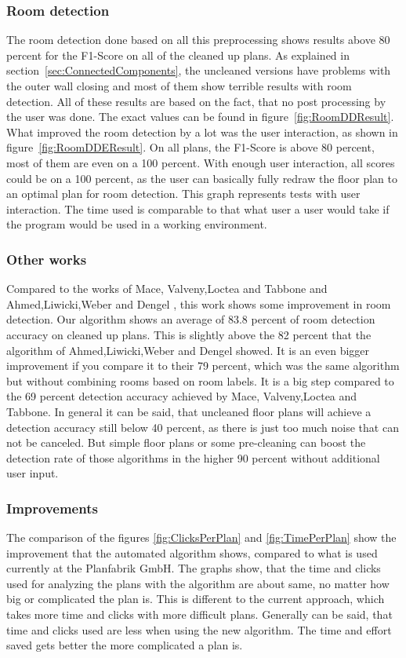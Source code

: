 \subsubsection{Room detection}
The room detection done based on all this preprocessing shows results above 80 percent for the F1-Score on all of the cleaned up plans. As explained in section~\ref{sec:ConnectedComponents}, the uncleaned versions have problems with the outer wall closing and most of them show terrible results with room detection. All of these results are based on the fact, that no post processing by the user was done. The exact values can be found in figure~\ref{fig:RoomDDResult}. What improved the room detection by a lot was the user interaction, as shown in figure~\ref{fig:RoomDDEResult}. On all plans, the F1-Score is above 80 percent, most of them are even on a 100 percent. With enough user interaction, all scores could be on a 100 percent, as the user can basically fully redraw the floor plan to an optimal plan for room detection. This graph represents tests with user interaction. The time used is comparable to that what user a user would take if the program would be used in a working environment.

\subsubsection{Other works}
Compared to the works of Mace, Valveny,Loctea and Tabbone \citep{mace_valveny_loctea_tabbone_2010} and Ahmed,Liwicki,Weber and Dengel \citep{ahmed_liwicki_weber_dengel_2012}, this work shows some improvement in room detection. Our algorithm shows an average of 83.8 percent of room detection accuracy on cleaned up plans. This is slightly above the 82 percent that the algorithm of Ahmed,Liwicki,Weber and Dengel showed. It is an even bigger improvement if you compare it to their 79 percent, which was the same algorithm but without combining rooms based on room labels. It is a big step compared to the 69 percent detection accuracy achieved by Mace, Valveny,Loctea and Tabbone. In general it can be said, that uncleaned floor plans will achieve a detection accuracy still below 40 percent, as there is just too much noise that can not be canceled. But simple floor plans or some pre-cleaning can boost the detection rate of those algorithms in the higher 90 percent without additional user input. 

\subsubsection{Improvements}
The comparison of the figures \ref{fig:ClicksPerPlan} and \ref{fig:TimePerPlan} show the improvement that the automated algorithm shows, compared to what is used currently at the Planfabrik GmbH. The graphs show, that the time and clicks used for analyzing the plans with the algorithm are about same, no matter how big or complicated the plan is. This is different to the current approach, which takes more time and clicks with more difficult plans. Generally can be said, that time and clicks used are less when using the new algorithm. The time and effort saved gets better the more complicated a plan is. 

